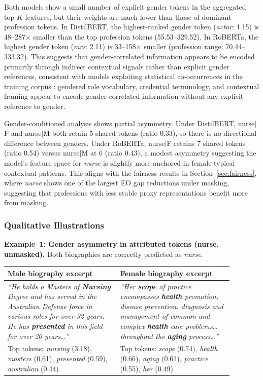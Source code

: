 \documentclass[11pt]{article}
\begin{document}
Both models show a small number of explicit gender tokens in the
aggregated top-$K$ features, but their weights are much lower than
those of dominant profession tokens. In DistilBERT, the highest-ranked
gender token (\emph{actor}: 1.15) is 48--287$\times$ smaller than the
top profession tokens (55.53--329.52). In RoBERTa, the highest gender
token (\emph{mrs}: 2.11) is 33--158$\times$ smaller (profession range:
70.44--333.32). This suggests that gender-correlated information appears to be encoded
primarily through indirect contextual signals rather than explicit gender
references, consistent with models exploiting statistical
co-occurrences in the training corpus \citep{de-arteaga-etal-2019-bias,
gonen-goldberg-2019-lipstick}: gendered role vocabulary, credential
terminology, and contextual framing appear to encode gender-correlated
information without any explicit reference to gender.

Gender-conditioned analysis shows partial asymmetry.
Under DistilBERT, nurse$|$F and nurse$|$M both retain 5 shared tokens
(ratio 0.33), so there is no directional difference between genders.
Under RoBERTa, nurse$|$F retains 7 shared tokens (ratio 0.54) versus
nurse$|$M at 6 (ratio 0.43), a modest asymmetry suggesting the model's
feature space for \emph{nurse} is slightly more anchored in
female-typical contextual patterns.
This aligns with the fairness results in Section~\ref{sec:fairness},
where \emph{nurse} shows one of the largest EO gap reductions under
masking, suggesting that professions with less stable proxy
representations benefit more from masking.

\subsubsection*{Qualitative Illustrations}

\medskip
\noindent\textbf{Example~1: Gender asymmetry in attributed tokens
(nurse, unmasked).}
Both biographies are correctly predicted as \emph{nurse}.

\begin{center}\small
\begin{tabular}{p{0.44\linewidth}p{0.44\linewidth}}
\toprule
\textbf{Male biography excerpt} & \textbf{Female biography excerpt} \\
\midrule
\textit{``He holds a Masters of \textbf{Nursing} Degree and has
served in the Australian Defense force in various roles for over
32 years. He has \textbf{presented} in this field for over
20 years\ldots''} &
\textit{``Her \textbf{scope} of practice encompasses \textbf{health}
promotion, disease prevention, diagnosis and management of common and
complex \textbf{health} care problems\ldots throughout the
\textbf{aging} process\ldots''} \\
\midrule
Top tokens: \emph{nursing} (3.18), \emph{masters} (0.61),
\emph{presented} (0.59), \emph{australian} (0.44) &
Top tokens: \emph{scope} (0.74), \emph{health} (0.66),
\emph{aging} (0.61), \emph{practice} (0.55), \emph{her} (0.49) \\
\bottomrule
\end{tabular}
\end{center}
\end{document}
